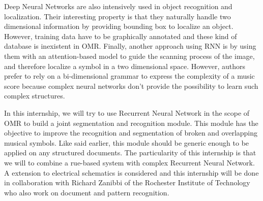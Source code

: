 \documentclass[11pt]{sdm}
\begin{document}
Deep Neural Networks are also intensively used in object recognition and localization.
Their interesting property is that they naturally handle two dimensional information by providing bounding box to localize an object.
However, training data have to be graphically annotated and these kind of database is inexistent in OMR.
Finally, another approach using RNN is by using them with an attention-based model to guide the scanning process of the image, and therefore localize a symbol in a two dimensional space.
However, authors prefer to rely on a bi-dimensional grammar to express the complexity of a music score because complex neural networks don't provide the possibility to learn such complex structures.

In this internship, we will try to use Recurrent Neural Network in the scope of OMR to build a joint segmentation and recognition module.
This module has the objective to improve the recognition and segmentation of broken and overlapping musical symbols.
Like said earlier, this module should be generic enough to be applied on any structured documents.
The particularity of this internship is that we will to combine a rue-based system with complex Recurrent Neural Network.
A extension to electrical schematics is considered and this internship will be done in collaboration with Richard Zanibbi of the Rochester Institute of Technology who also work on document and pattern recognition.



\end{document}
